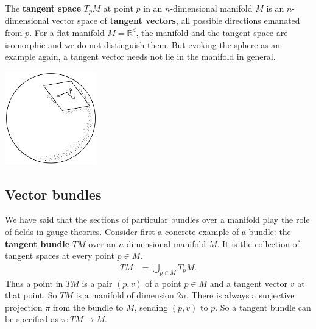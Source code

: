 \documentclass[aps,nofootinbib]{revtex4}
\begin{document}
The {\bf tangent space} $T_p M$ at point $p$ in an $n$-dimensional manifold $M$ is an $n$-dimensional vector space of {\bf tangent vectors}, all possible directions emanated from $p$. For a flat manifold $M = \mathbb{R}^d$, the manifold and the tangent space are isomorphic and we do not distinguish them. But evoking the sphere as an example again, a tangent vector needs not lie in the manifold in general.
\begin{center}
\includegraphics[width=0.3\textwidth]{tangent.png}
\end{center}

\subsection{Vector bundles}

We have said that the sections of particular bundles over a manifold play the role of fields in gauge theories. Consider first a concrete example of a bundle: the {\bf tangent bundle} $TM$ over an $n$-dimensional manifold $M$. It is the collection of tangent spaces at every point $p \in M$.
\begin{align*}
TM &= \bigcup_{p \in M} T_p M.
\end{align*}
Thus a point in $TM$ is a pair $(p,v)$ of a point $p \in M$ and a tangent vector $v$ at that point. So $TM$ is a manifold of dimension $2n$. There is always a surjective projection $\pi$ from the bundle to $M$, sending $(p,v)$ to $p$. So a tangent bundle can be specified as $\pi:TM \to M$.
\end{document}
